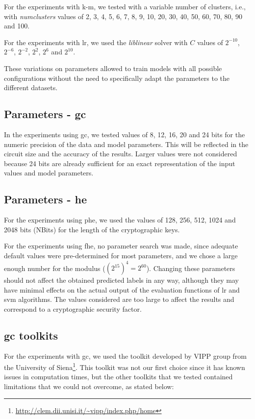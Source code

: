 For the experiments with \ac{k-m}, we tested with a variable number of clusters, i.e., with \textit{num\textunderscore clusters} values of 2, 3, 4, 5, 6, 7, 8, 9, 10, 20, 30, 40, 50, 60, 70, 80, 90 and 100.

For the experiments with \ac{lr}, we used the \textit{liblinear} solver with $C$ values of $2^{-10}$, $2^{-6}$, $2^{-2}$, $2^{2}$, $2^{6}$ and $2^{10}$.

 These variations on parameters allowed to train models with all possible configurations without the need to specifically adapt the parameters to the different datasets.



\subsection{Parameters - \acl{gc}}

In the experiments using \ac{gc}, we tested values of 8, 12, 16, 20 and 24 bits for the numeric precision of the data and model parameters. This will be reflected in the circuit size and the accuracy of the results. Larger values were not considered because 24 bits are already sufficient for an exact representation of the input values and model parameters.

\subsection{Parameters - \acl{he}}

For the experiments using \ac{phe}, we used the values of 128, 256, 512, 1024 and 2048 bits (NBits) for the length of the cryptographic keys.

For the experiments using \ac{fhe}, no parameter search was made, since adequate default values were pre-determined for most parameters, and we chose a large enough number for the modulus ($(2^{15})^4=2^{60}$). Changing these parameters should not affect the obtained predicted labels in any way, although they may have minimal effects on the actual output of the evaluation functions of \ac{lr} and \ac{svm} algorithms. The values considered are too large to affect the results and correspond to a cryptographic security factor.



\subsection{\acl{gc} toolkits}


For the experiments with \ac{gc}, we used the toolkit developed by VIPP group from the University of Siena\footnote{\url{http://clem.dii.unisi.it/~vipp/index.php/home}}. This toolkit was not our first choice since it has known issues in computation times, but the other toolkits that we tested contained limitations that we could not overcome, as stated below:

